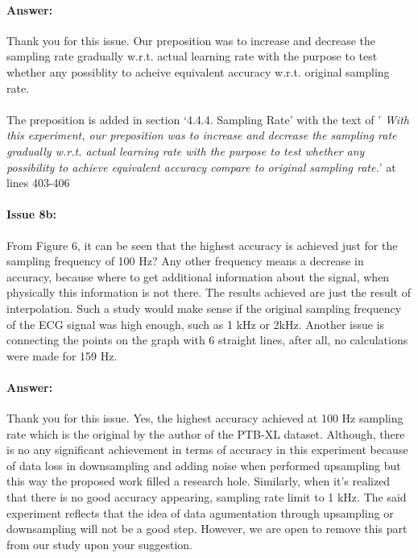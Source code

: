 \documentclass{article}
\begin{document}
\paragraph{Answer:}
Thank you for this issue. Our preposition was to increase and decrease the sampling rate gradually w.r.t. actual learning rate with the purpose to test whether any possiblity to acheive equivalent accuracy w.r.t. original sampling rate.  \\\\

The preposition is added in section `4.4.4. Sampling Rate' with the text of '\textit{ With this experiment, our preposition was to increase and decrease the sampling rate gradually w.r.t. actual learning rate with the purpose to test whether any possibility to achieve equivalent accuracy compare to original sampling rate.}' at lines 403-406

\paragraph{Issue 8b:}
\begin{displayquote}
From Figure 6, it can be seen that the highest accuracy is achieved just for the sampling frequency of 100 Hz? Any other frequency means a decrease in accuracy, because where to get additional information about the signal, when physically this information is not there. The results achieved are just the result of interpolation. Such a study would make sense if the original sampling frequency of the ECG signal was high enough, such as 1 kHz or 2kHz. Another issue is connecting the points on the graph with 6 straight lines, after all, no calculations were made for 159 Hz.
\end{displayquote}

\paragraph{Answer:}
Thank you for this issue. Yes, the highest accuracy achieved at 100 Hz sampling rate which is the original by the author of the PTB-XL dataset. Although, there is no any significant achievement in terms of accuracy in this experiment because of data loss in downsampling and adding noise when performed upsampling but this way the proposed work filled a research hole. Similarly, when it's realized that there is no good accuracy appearing, sampling rate limit to 1 kHz. The said experiment reflects that the idea of data agumentation through upsampling or downsampling will not be a good step. However, we are open to remove this part from our study upon your suggestion.
\end{document}
